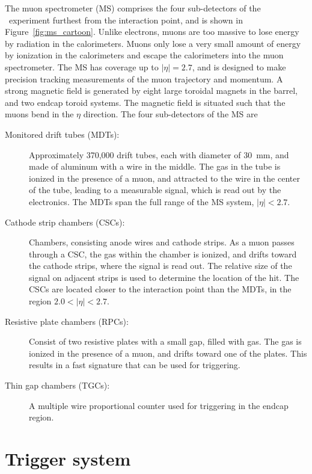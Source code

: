 The muon spectrometer (MS) comprises the four sub-detectors of the
\atlas\ experiment furthest from the interaction point, and is shown in
Figure~\ref{fig:ms_cartoon}.
Unlike electrons, muons are too massive to lose energy by radiation in the
calorimeters.
Muons only lose a very small amount of energy by ionization in the calorimeters
and escape the calorimeters into the muon spectrometer.
The MS has coverage up to $|\eta| = 2.7$, and is designed to make precision
tracking measurements of the muon trajectory and momentum.
A strong magnetic field is generated by eight large toroidal magnets in the
barrel, and two endcap toroid systems.
The magnetic field is situated such that the muons bend in the $\eta$
direction.
The four sub-detectors of the MS are
\begin{description}
  \item[Monitored drift tubes (MDTs):] 
    Approximately 370,000 drift tubes, each with diameter of 30~mm, and made of
    aluminum with a wire in the middle.
    The gas in the tube is ionized in the presence of a muon, and attracted to
    the wire in the center of the tube, leading to a measurable signal, which
    is read out by the electronics.
    The MDTs span the full range of the MS system, $|\eta| < 2.7$.
  \item[Cathode strip chambers (CSCs):] 
    Chambers, consisting anode wires and cathode strips.
    As a muon passes through a CSC, the gas within the chamber is ionized, and
    drifts toward the cathode strips, where the signal is read out.
    The relative size of the signal on adjacent strips is used to determine the
    location of the hit.
    The CSCs are located closer to the interaction point than the MDTs, in the
    region $2.0 < |\eta| < 2.7$.
  \item[Resistive plate chambers (RPCs):] 
    Consist of two resistive plates with a small gap, filled with gas.
    The gas is ionized in the presence of a muon, and drifts toward one of the
    plates.
    This results in a fast signature that can be used for triggering.
  \item[Thin gap chambers (TGCs):] 
    A multiple wire proportional counter used for triggering in the endcap
    region.
\end{description}

\FloatBarrier
\section{Trigger system}

